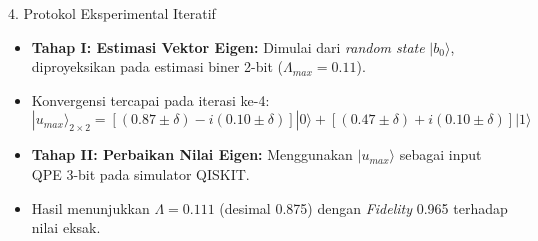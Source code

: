 \begin{frame}{4. Protokol Eksperimental Iteratif}
    \begin{itemize}
        \item \textbf{Tahap I: Estimasi Vektor Eigen:} Dimulai dari \textit{random state} $|b_0\rangle$, diproyeksikan pada estimasi biner 2-bit ($\Lambda_{max} = 0.11$).
        \item Konvergensi tercapai pada iterasi ke-4:
        \begin{equation}
            |u_{max}\rangle_{2\times2} = [(0.87 \pm \delta) - i(0.10 \pm \delta)]|0\rangle + [(0.47 \pm \delta) + i(0.10 \pm \delta)]|1\rangle
        \end{equation}
        \item \textbf{Tahap II: Perbaikan Nilai Eigen:} Menggunakan $|u_{max}\rangle$ sebagai input QPE 3-bit pada simulator QISKIT.
        \item Hasil menunjukkan $\Lambda = 0.111$ (desimal 0.875) dengan \textit{Fidelity} 0.965 terhadap nilai eksak.
    \end{itemize}
\end{frame}
